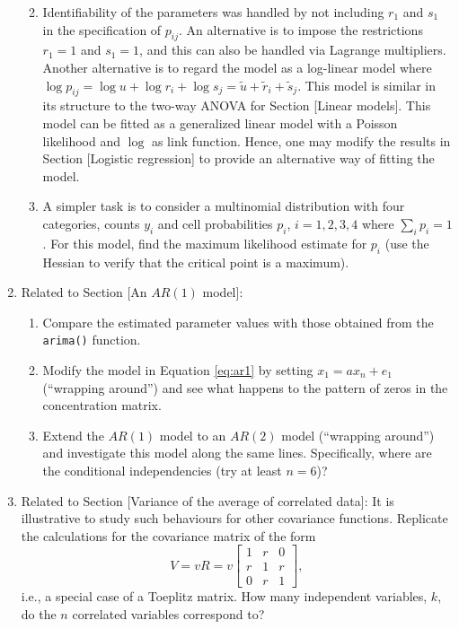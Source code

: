 \begin{enumerate}
  \begin{enumerate}
  \def\labelenumii{\alph{enumii})}
  \tightlist
  \item
    Identifiability of the parameters was handled by not including
    \(r_1\) and \(s_1\) in the specification of \(p_{ij}\). An alternative is
    to impose the restrictions \(r_1=1\) and \(s_1=1\), and this can also
    be handled via Lagrange multipliers. Another alternative is to regard
    the model as a log-linear model where \(\log p_{ij} = \log u + \log r_i + \log s_j = \tilde{u} + \tilde{r}_i + \tilde{s}_j\). This model
    is similar in its structure to the two-way ANOVA for Section {[}Linear
    models{]}. This model can be fitted as a generalized linear model
    with a Poisson likelihood and \(\log\) as link function. Hence, one
    may modify the results in Section {[}Logistic regression{]} to
    provide an alternative way of fitting the model.
  \item
    A simpler task is
    to consider a multinomial distribution with four categories,
    counts \(y_i\) and cell probabilities \(p_i\), \(i=1,2,3,4\) where \(\sum_i p_i=1\). For this model, find the maximum likelihood estimate for
    \(p_i\) (use the Hessian to verify that the critical point is a maximum).
  \end{enumerate}
\item
  Related to Section {[}An \(AR(1)\) model{]}:

  \begin{enumerate}
  \def\labelenumii{\alph{enumii})}
  \tightlist
  \item
    Compare the estimated parameter values with those obtained from
    the \texttt{arima()} function.
  \item
    Modify the model in Equation \eqref{eq:ar1} by
    setting \(x_1 = a x_n + e_1\) (``wrapping around'') and see what happens
    to the pattern of zeros in the concentration matrix.
  \item
    Extend the
    \(AR(1)\) model to an \(AR(2)\) model (``wrapping around'') and
    investigate this model along the same lines. Specifically,
    where are the conditional independencies (try at least \(n=6\))?
  \end{enumerate}
\item
  Related to Section {[}Variance of the average of correlated data{]}: It
  is illustrative to study such behaviours for other covariance
  functions.
  Replicate the calculations for the covariance matrix of the form
  \begin{equation}
    \label{eq:ex5}
    V = v R = v \left[\begin{matrix}1 & r & 0\\r & 1 & r\\0 & r & 1\end{matrix}\right],
  \end{equation}
  i.e., a special case of a Toeplitz matrix.
  How many independent variables, \(k\), do
  the \(n\) correlated variables correspond to?
\end{enumerate}

